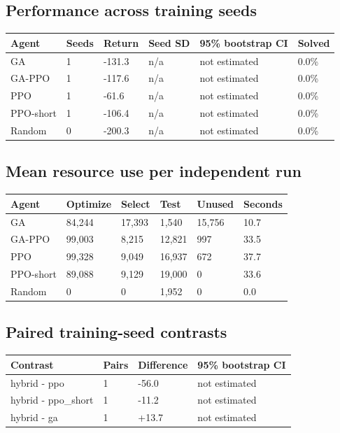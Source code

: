 \documentclass[11pt,a4paper]{article}
\begin{document}
\subsection*{Performance across training seeds}
\begingroup\small
\begin{longtable}{p{}p{}p{}p{}p{}p{}}
\toprule
Agent & Seeds & Return & Seed SD & 95\% bootstrap CI & Solved \\
\midrule\endhead
GA & 1 & -131.3 & n/a & not estimated & 0.0\% \\
GA-PPO & 1 & -117.6 & n/a & not estimated & 0.0\% \\
PPO & 1 & -61.6 & n/a & not estimated & 0.0\% \\
PPO-short & 1 & -106.4 & n/a & not estimated & 0.0\% \\
Random & 0 & -200.3 & n/a & not estimated & 0.0\% \\
\bottomrule\end{longtable}
\endgroup
\subsection*{Mean resource use per independent run}
\begingroup\small
\begin{longtable}{p{}p{}p{}p{}p{}p{}}
\toprule
Agent & Optimize & Select & Test & Unused & Seconds \\
\midrule\endhead
GA & 84,244 & 17,393 & 1,540 & 15,756 & 10.7 \\
GA-PPO & 99,003 & 8,215 & 12,821 & 997 & 33.5 \\
PPO & 99,328 & 9,049 & 16,937 & 672 & 37.7 \\
PPO-short & 89,088 & 9,129 & 19,000 & 0 & 33.6 \\
Random & 0 & 0 & 1,952 & 0 & 0.0 \\
\bottomrule\end{longtable}
\endgroup
\subsection*{Paired training-seed contrasts}
\begingroup\small
\begin{longtable}{p{}p{}p{}p{}}
\toprule
Contrast & Pairs & Difference & 95\% bootstrap CI \\
\midrule\endhead
hybrid - ppo & 1 & -56.0 & not estimated \\
hybrid - ppo\_short & 1 & -11.2 & not estimated \\
hybrid - ga & 1 & +13.7 & not estimated \\
\bottomrule\end{longtable}
\endgroup
\end{document}
